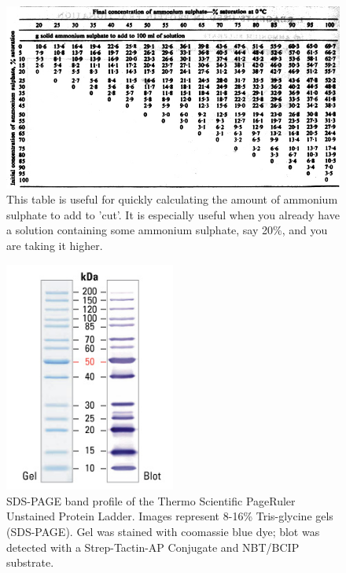 \documentclass{tufte-book} %
\begin{document}
\begin{figure}[h]
  \centering
      \includegraphics[width=1.0\textwidth]{M1-5}
  \caption{This table is useful for quickly calculating the amount of ammonium sulphate to add to 'cut'. It is especially useful when you already have a solution containing some ammonium sulphate, say 20\%, and you are taking it higher.}
\end{figure}




\begin{figure}[h]
  \centering
      \includegraphics[width=0.5\textwidth]{26614-ladder-002}
  \caption{SDS-PAGE band profile of the Thermo Scientific PageRuler Unstained Protein Ladder. Images represent 8-16\% Tris-glycine gels (SDS-PAGE). Gel was stained with coomassie blue dye; blot was detected with a Strep-Tactin-AP Conjugate and NBT/BCIP substrate.}
\end{figure}
\end{document}
